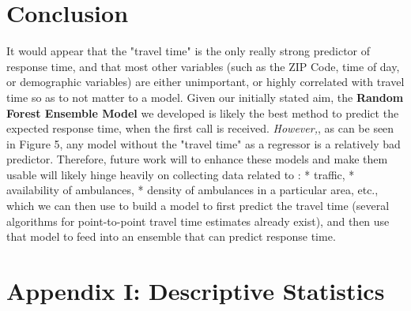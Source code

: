 \documentclass[twoside,11pt]{article}
\begin{document}
\section{Conclusion}
It would appear that the "travel time" is the only really strong predictor of response time, and that most other variables (such as the ZIP Code, time of day, or demographic variables) are either unimportant, or highly correlated with travel time so as to not matter to a model. Given our initially stated aim, the \textbf{Random Forest Ensemble Model} we developed is likely the best method to predict the expected response time, when the first call is received. \emph{However,}, as can be seen in Figure 5, any model without the "travel time" as a regressor is a relatively bad predictor. Therefore, future work will to enhance these models and make them usable will likely hinge heavily on collecting data related to :
* traffic,
* availability of ambulances,
* density of ambulances in a particular area, etc.,
which we can then use to build a model to first predict the travel time (several algorithms for point-to-point travel time estimates already exist), and then use that model to feed into an ensemble that can predict response time.


\newpage
\section*{Appendix I: Descriptive Statistics}
\end{document}
